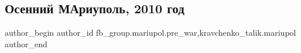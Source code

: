  
 
 
 
 

\subsection{Осенний МАриуполь, 2010 год}
\label{sec:13_02_2023.fb.fb_group.mariupol.pre_war.5.osennii_mariupol__20}
 
\ifcmt
 author_begin
   author_id fb_group.mariupol.pre_war,kravchenko_talik.mariupol
 author_end
\fi

